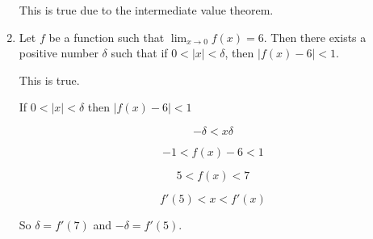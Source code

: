 \documentclass{article}
\begin{document}
\begin{enumerate}
		This is true due to the intermediate value theorem.

	\item Let $f$ be a function such that $\lim _{x \to 0} f(x) = 6$. Then there exists
		a positive number $\delta$ such that if $0 < |x| < \delta$, then $|f(x) - 6| < 1$.

		This is true. 

		If $0 < |x| < \delta$ then $|f(x) - 6| < 1$

		$$-\delta < x \delta$$

		$$-1 < f(x) - 6 < 1$$

		$$5 < f(x) < 7$$

		$$f'(5) < x < f'(x)$$

		So $\delta = f'(7)$ and $-\delta = f'(5)$.
\end{enumerate}
\end{document}

